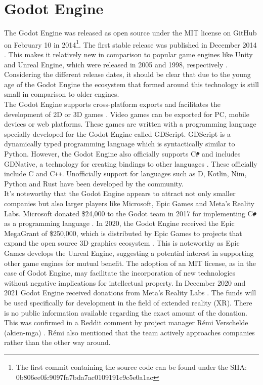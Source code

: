 \section{Godot Engine}
The Godot Engine was released as open source under the MIT license on GitHub on February 10 in 2014\footnote{The first commit containing the source code can be found under the SHA:\\ 0b806ee0fc9097fa7bda7ac0109191c9c5e0a1ac}\cite{godot-repository}.
The first stable release was published in December 2014 \cite{godot-release}.
This makes it relatively new in comparison to popular game engines like Unity and Unreal Engine, which were released in 2005 and 1998, respectively \cite{unity-release, unreal-release}.
Considering the different release dates, it should be clear that due to the young age of the Godot Engine the ecosystem that formed around this technology is still small in comparison to older engines.\\

The Godot Engine supports cross-platform exports and facilitates the development of 2D or 3D games \cite{godot-engine}.
Video games can be exported for PC, mobile devices or web platforms.
These games are written with a programming language specially developed for the Godot Engine called GDScript.
GDScript is a dynamically typed programming language which is syntactically similar to Python.
However, the Godot Engine also officially supports C\texttt{\#} and includes GDNative, a technology for creating bindings to other languages \cite{godot-gdnative}.
These officially include C and C\texttt{++}.
Unofficially support for languages such as D, Kotlin, Nim, Python and Rust have been developed by the community.\\

It's noteworthy that the Godot Engine appears to attract not only smaller companies but also larger players like Microsoft, Epic Games and Meta's Reality Labs.
Microsoft donated \$24,000 to the Godot team in 2017 for implementing C\texttt{\#} as a programming language \cite{godot-csharp}.
In 2020, the Godot Engine received the Epic MegaGrant of \$250,000, which is distributed by Epic Games to projects that expand the open source 3D graphics ecosystem \cite{godot-megagrant}.
This is noteworthy as Epic Games develops the Unreal Engine, suggesting a potential interest in supporting other game engines for mutual benefit.
The adoption of an MIT license, as in the case of Godot Engine, may facilitate the incorporation of new technologies without negative implications for intellectual property.
In December 2020 and 2021 Godot Engine received donations from Meta's Reality Labs \cite{godot-facebook-reality, godot-meta-reality}.
The funds will be used specifically for development in the field of extended reality (XR).
There is no public information available regarding the exact amount of the donation.
This was confirmed in a Reddit comment by project manager Rémi Verschelde (akien-mga) \cite{reddit-companies-akien}.
Rémi also mentioned that the team actively approaches companies rather than the other way around.
